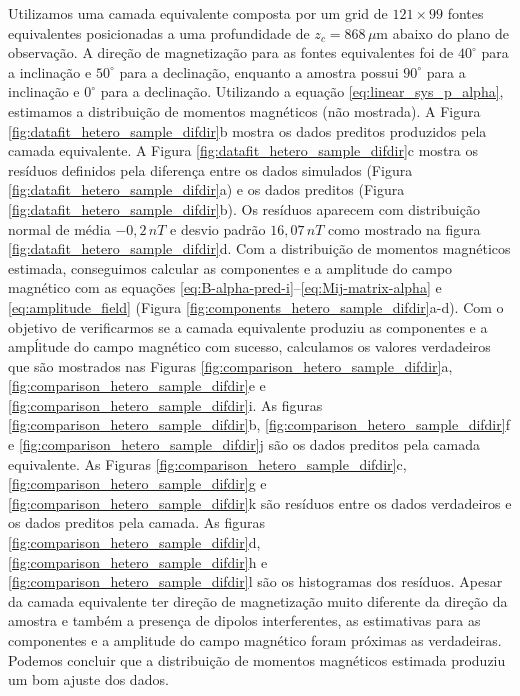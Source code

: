 Utilizamos uma camada equivalente composta por um grid de $121 \times 99$ fontes equivalentes posicionadas a uma profundidade de $z_c = 868\, \mu $m abaixo do plano de observação. 
A direção de magnetização para as fontes equivalentes foi de $40^\circ$ para a inclinação e $50^\circ$ para a declinação, enquanto a amostra possui $90^\circ$ para a inclinação e $0^\circ$ para a declinação. 
Utilizando a equação \ref{eq:linear_sys_p_alpha}, estimamos a distribuição de momentos magnéticos (não mostrada). 
A Figura \ref{fig:datafit_hetero_sample_difdir}b mostra os dados preditos produzidos pela camada equivalente. 
A Figura \ref{fig:datafit_hetero_sample_difdir}c mostra os resíduos definidos pela diferença entre os dados simulados (Figura \ref{fig:datafit_hetero_sample_difdir}a) e os dados preditos (Figura \ref{fig:datafit_hetero_sample_difdir}b). Os resíduos aparecem com distribuição normal de média $-0,2 \, nT$ e desvio padrão $16,07 \, nT$ como mostrado na figura \ref{fig:datafit_hetero_sample_difdir}d. Com a distribuição de momentos magnéticos estimada, conseguimos calcular as componentes e a amplitude do campo magnético com as equações \ref{eq:B-alpha-pred-i}--\ref{eq:Mij-matrix-alpha} e \ref{eq:amplitude_field} (Figura \ref{fig:components_hetero_sample_difdir}a-d). Com o objetivo de verificarmos se a camada equivalente produziu as componentes e a ampĺitude do campo magnético com sucesso, calculamos os valores verdadeiros que são mostrados nas Figuras \ref{fig:comparison_hetero_sample_difdir}a, \ref{fig:comparison_hetero_sample_difdir}e e \ref{fig:comparison_hetero_sample_difdir}i. As figuras \ref{fig:comparison_hetero_sample_difdir}b, \ref{fig:comparison_hetero_sample_difdir}f e \ref{fig:comparison_hetero_sample_difdir}j são os dados preditos pela camada equivalente. 
As Figuras \ref{fig:comparison_hetero_sample_difdir}c, \ref{fig:comparison_hetero_sample_difdir}g e \ref{fig:comparison_hetero_sample_difdir}k são resíduos entre os dados verdadeiros e os dados preditos pela camada. As figuras \ref{fig:comparison_hetero_sample_difdir}d, \ref{fig:comparison_hetero_sample_difdir}h e \ref{fig:comparison_hetero_sample_difdir}l são os histogramas dos resíduos. Apesar da camada equivalente ter direção de magnetização muito diferente da direção da amostra e também a presença de dipolos interferentes, as estimativas para as componentes e a amplitude do campo magnético foram próximas as verdadeiras. Podemos concluir que a distribuição de momentos magnéticos estimada produziu um bom ajuste dos dados.   


